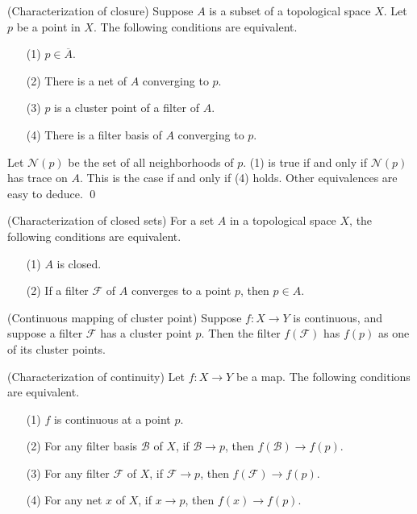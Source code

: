 \documentclass{report}
\begin{document}
\begin{prp}\label{characterize closure} (Characterization of closure)
    Suppose \( A \) is a subset of a topological space \( X \). Let \( p \) be a point in \( X \). The following conditions are equivalent.
    \begin{itemize}
        \item[(1)] \( p \in \overline{A} \).
        \item[(2)] There is a net of \( A \) converging to \( p \).
        \item[(3)] \( p \) is a cluster point of a filter of \( A \).
        \item[(4)] There is a filter basis of \( A \) converging to \( p \).
    \end{itemize}
\end{prp}
\begin{prf}
    Let \( \mathscr{N}(p) \) be the set of all neighborhoods of \( p \).
    (1) is true if and only if \( \mathscr{N}(p) \) has trace on \( A \). This is the case if and only if (4) holds. Other equivalences are easy to deduce.
    \qed\end{prf}

\begin{exe}\label{characterize closed} (Characterization of closed sets)
    For a set \( A \) in a topological space \( X \), the following conditions are equivalent.
    \begin{itemize}
        \item[(1)] \( A \) is closed.
        \item[(2)] If a filter \( \mathscr{F} \) of \( A \) converges to a point \( p \), then \( p \in A \).
    \end{itemize}
\end{exe}

\begin{exe}\label{continous mapping of cp} (Continuous mapping of cluster point)
    Suppose \( f:X \to Y \) is continuous, and suppose a filter \( \mathscr{F} \) has a cluster point \( p \). Then the filter \( f(\mathscr{F}) \) has \( f(p) \) as one of its cluster points.
\end{exe}

\begin{prp}\label{characterize continuity} (Characterization of continuity)
    Let \( f:X \to Y \) be a map. The following conditions are equivalent.
    \begin{itemize}
        \item[(1)] \( f \) is continuous at a point \( p \).
        \item[(2)] For any filter basis \( \mathscr{B} \) of \( X \), if \( \mathscr{B} \to p \), then \( f(\mathscr{B}) \to f(p) \).
        \item[(3)] For any filter \( \mathscr{F} \) of \( X \), if \( \mathscr{F} \to p \), then \( f(\mathscr{F})\to f(p) \).
        \item[(4)] For any net \( x \) of \( X \), if \( x \to p \), then \( f(x)\to f(p) \).
    \end{itemize}
\end{prp}
\end{document}
